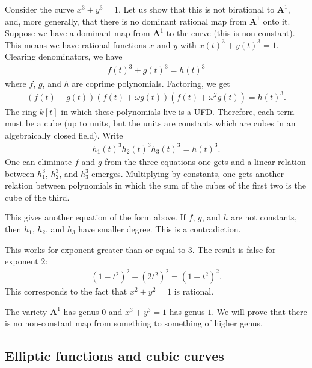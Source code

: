 \documentclass[11pt, oneside,margin=1in]{article}
\begin{document}
\begin{example}[ ]\label{}\text{}
Consider the curve $x^3+y^3=1$. Let us show that this is not birational to $\mathbf{A}^1$, and, more generally, that there is no dominant rational map from $\mathbf{A}^1$ onto it. Suppose we have a dominant map from $\mathbf{A}^1$ to the curve (this is non-constant). This means we have rational functions $x$ and $y$ with $x(t)^3+y (t)^3 =1$. Clearing denominators, we have 
\begin{align*}
	f(t)^3+g (t)^3=h (t)^3
\end{align*}
where $f$, $g$, and $h$ are coprime polynomials. Factoring, we get
\begin{align*}
	(f(t)+g (t)) (f(t)+\omega g (t)) (f(t) + \omega^2g (t)) = h(t)^3.
\end{align*}
The ring $k[t]$ in which these polynomials live is a UFD. Therefore, each term must be a cube (up to units, but the units are constants which are cubes in an algebraically closed field). Write
\begin{align*}
	h_1 (t)^3 h_2(t)^3  h_3(t)^3 = h (t)^3.
\end{align*}
One can eliminate $f$ and $g$ from the three equations one gets and a linear relation between $h_1^3$, $h_2^3$, and $h_3^3$ emerges. Multiplying by constants, one gets another relation between polynomials in which the sum of the cubes of the first two is the cube of the third. 

This gives another equation of the form above. If $f$, $g$, and $h$ are not constants, then $h_1$, $h_2$, and $h_3$ have smaller degree. This is a contradiction.
\end{example}

\begin{remark}
	This works for exponent greater than or equal to $3$. The result is false for exponent $2$:
	\begin{align*}
		(1-t^2)^2 +  (2t^2)^2 =  (1+t^2)^2.
	\end{align*}
	This corresponds to the fact that $x^2+y^2=1$ is rational.
\end{remark}

\begin{remark}
	The variety $\mathbf{A}^1$ has genus $0$ and $x^3+y^3=1$ has genus $1$. We will prove that there is no non-constant map from something to something of higher genus.
\end{remark}
\subsection{Elliptic functions and cubic curves}
\end{document}
